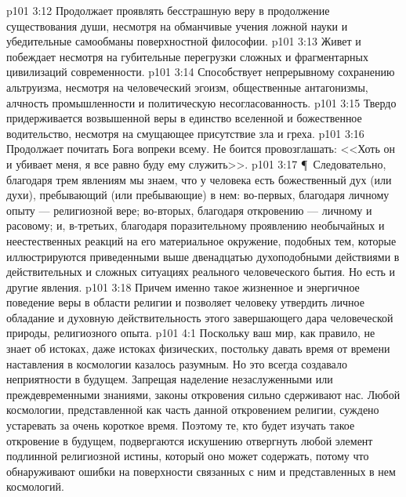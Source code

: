 \vs p101 3:12 \bibnobreakspace Продолжает проявлять бесстрашную веру в продолжение существования души, несмотря на обманчивые учения ложной науки и убедительные самообманы поверхностной философии.
\vs p101 3:13 \bibnobreakspace Живет и побеждает несмотря на губительные перегрузки сложных и фрагментарных цивилизаций современности.
\vs p101 3:14 \bibnobreakspace Способствует непрерывному сохранению альтруизма, несмотря на человеческий эгоизм, общественные антагонизмы, алчность промышленности и политическую несогласованность.
\vs p101 3:15 \bibnobreakspace Твердо придерживается возвышенной веры в единство вселенной и божественное водительство, несмотря на смущающее присутствие зла и греха.
\vs p101 3:16 \bibnobreakspace Продолжает почитать Бога вопреки всему. Не боится провозглашать: <<Хоть он и убивает меня, я все равно буду ему служить>>.
\vs p101 3:17 \P\ Следовательно, благодаря трем явлениям мы знаем, что у человека есть божественный дух (или духи), пребывающий (или пребывающие) в нем: во\hyp{}первых, благодаря личному опыту --- религиозной вере; во\hyp{}вторых, благодаря откровению --- личному и расовому; и, в\hyp{}третьих, благодаря поразительному проявлению необычайных и неестественных реакций на его материальное окружение, подобных тем, которые иллюстрируются приведенными выше двенадцатью духоподобными действиями в действительных и сложных ситуациях реального человеческого бытия. Но есть и другие явления.
\vs p101 3:18 Причем именно такое жизненное и энергичное поведение веры в области религии и позволяет человеку утвердить личное обладание и духовную действительность этого завершающего дара человеческой природы, религиозного опыта.
\vs p101 4:1 Поскольку ваш мир, как правило, не знает об истоках, даже истоках физических, постольку давать время от времени наставления в космологии казалось разумным. Но это всегда создавало неприятности в будущем. Запрещая наделение незаслуженными или преждевременными знаниями, законы откровения сильно сдерживают нас. Любой космологии, представленной как часть данной откровением религии, суждено устаревать за очень короткое время. Поэтому те, кто будет изучать такое откровение в будущем, подвергаются искушению отвергнуть любой элемент подлинной религиозной истины, который оно может содержать, потому что обнаруживают ошибки на поверхности связанных с ним и представленных в нем космологий.
